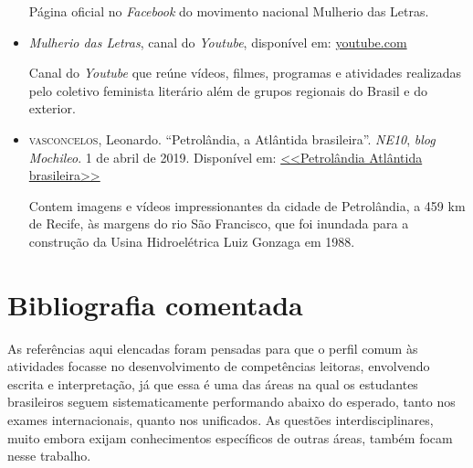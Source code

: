 \documentclass[12pt]{extarticle}
\begin{document}
\begin{itemize}
    Página oficial no \emph{Facebook} do movimento nacional Mulherio das
    Letras.

\item    \emph{Mulherio das Letras}, canal do \emph{Youtube}, disponível em:
    \href{https://www.youtube.com/channel/UCzOwcQ9fdT5GmD8IJR_21SA/videos}{youtube.com}

    Canal do \emph{Youtube} que reúne vídeos, filmes, programas e
    atividades realizadas pelo coletivo feminista literário além de
    grupos regionais do Brasil e do exterior.

\item    \textsc{vasconcelos}, Leonardo. ``Petrolândia, a Atlântida brasileira''.
    \emph{NE10}, \emph{blog Mochileo}. 1 de abril de 2019. Disponível
    em:
    \href{https://m.blogs.ne10.uol.com.br/mochileo/2019/04/01/petrolandia-atlantida-brasileira/}{<<Petrolândia Atlântida brasileira>>}

    Contem imagens e vídeos impressionantes da cidade de Petrolândia, a
    459 km de Recife, às margens do rio São Francisco, que foi inundada
    para a construção da Usina Hidroelétrica Luiz Gonzaga em 1988.
\end{itemize}

\section{Bibliografia comentada}

    As referências aqui elencadas foram pensadas para que o perfil comum
    às atividades focasse no desenvolvimento de competências leitoras,
    envolvendo escrita e interpretação, já que essa é uma das áreas na
    qual os estudantes brasileiros seguem sistematicamente performando
    abaixo do esperado, tanto nos exames internacionais, quanto nos
    unificados. As questões interdisciplinares, muito embora exijam
    conhecimentos específicos de outras áreas, também focam nesse
    trabalho.
\end{document}
